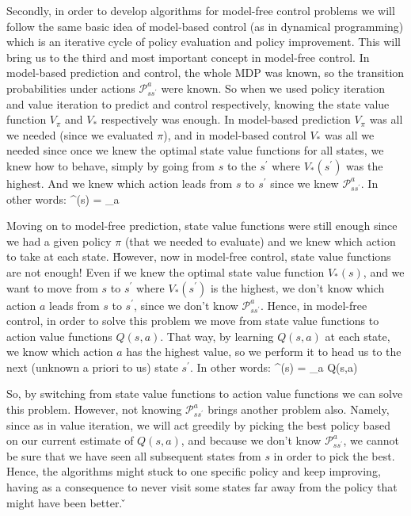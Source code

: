 Secondly, in order to develop algorithms for model-free control problems we will follow the same basic idea of
model-based control (as in dynamical programming) which is an iterative cycle of policy evaluation and policy
improvement. This will bring us to the third and most important concept in model-free control. In model-based
prediction and control, the whole MDP was known, so the transition probabilities under actions
$\mathcal{P}_{s s^\prime}^{a}$ were known. So when we used policy iteration and value iteration to predict and
control respectively, knowing the state value function $V_{\pi}$ and $V_{*}$ respectively was enough. In model-based
prediction $V_{\pi}$ was all we needed (since we evaluated $\pi$), and in model-based control $V_{*}$ was all we
needed since once we knew the optimal state value functions for all states, we knew how to behave, simply by going
from $s$ to the $s^\prime$ where $V_{*}(s^\prime)$ was the highest. And we knew which action leads from $s$ to
$s^\prime$ since we knew $\mathcal{P}_{s s^\prime}^{a}$. In other words:
\bse
\pi^\prime(s) = \argmax_{a} 
\ese

Moving on to model-free prediction, state value functions were still enough since we had a given policy $\pi$ (that
we needed to evaluate) and we knew which action to take at each state. \v

However, now in model-free control, state value functions are not enough! Even if we knew the optimal state value
function $V_{*}(s)$, and we want to move from $s$ to $s^\prime$ where $V_{*}(s^\prime)$ is the highest, we don't
know which action $a$ leads from $s$ to $s^\prime$, since we don't know $\mathcal{P}_{s s^\prime}^{a}$. Hence, in
model-free control, in order to solve this problem we move from state value functions to action value functions
$Q(s,a)$. That way, by learning $Q(s,a)$ at each state, we know which action $a$ has the highest value, so we
perform it to head us to the next (unknown a priori to us) state $s^\prime$. In other words:
\bse
\pi^\prime(s) = \argmax_{a} Q(s,a)
\ese

So, by switching from state value functions to action value functions we can solve this problem. However, not
knowing $\mathcal{P}_{s s^\prime}^{a}$ brings another problem also. Namely, since as in value iteration, we will act
greedily by picking the best policy based on our current estimate of $Q(s,a)$, and because we don't know
$\mathcal{P}_{s s^\prime}^{a}$, we cannot be sure that we have seen all subsequent states from $s$ in order to pick
the best. Hence, the algorithms might stuck to one specific policy and keep improving, having as a consequence to
never visit some states far away from the policy that might have been better. \v

